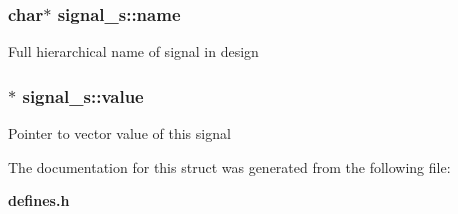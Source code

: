 \subsubsection{\setlength{\rightskip}{0pt plus 5cm}char$\ast$ signal\_\-s::name}\label{structsignal__s_m0}


Full hierarchical name of signal in design 
\subsubsection{$\ast$ signal\_\-s::value}\label{structsignal__s_m1}


Pointer to vector value of this signal 

The documentation for this struct was generated from the following file:\begin{CompactItemize}
\item 
{\bf defines.h}\end{CompactItemize}
